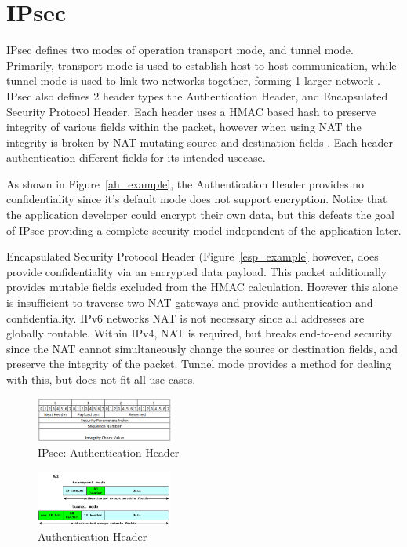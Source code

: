 \documentclass[conference,12pt]{IEEEtran}
\begin{document}
\section{IPsec}
IPsec defines two modes of operation transport mode, and tunnel mode. Primarily,
transport mode is used to establish host to host communication, while tunnel
mode is used to link two networks together, forming 1 larger network \autocite{cisco_ipsec}. IPsec also
defines 2 header types the Authentication Header, and Encapsulated Security
Protocol Header. Each header uses a HMAC based hash to preserve integrity of
various fields within the packet, however when using NAT the integrity is broken 
by NAT mutating source and destination fields \autocite{rfc3022}. Each header
authentication different fields for its intended usecase. 

As shown in Figure~\ref{ah_example}, the Authentication Header provides no
confidentiality since it's default mode does not support encryption.  Notice
that the application developer could encrypt their own data, but this defeats
the goal of IPsec providing a complete security model independent of the
application later. 

Encapsulated Security Protocol Header (Figure~\ref{esp_example} however, does
provide confidentiality via an encrypted data payload. This packet
additionally provides mutable fields excluded from the HMAC calculation. However
this alone is insufficient to traverse two NAT gateways and provide
authentication and confidentiality. IPv6
networks NAT is not necessary since all addresses are globally routable.
Within IPv4, NAT is required, but breaks end-to-end security since the
NAT cannot simultaneously change the source or destination fields, and preserve the integrity
of the packet. Tunnel mode provides a method for dealing with this, but does not
fit all use cases. 

\begin{figure}
\centering
\includegraphics[width=0.4\textwidth]{AH.png}
\caption{IPsec: Authentication Header}
\label{fig:ah}
\end{figure}

\begin{figure}
\centering
\includegraphics[width=0.4\textwidth]{AH_example.PNG}
\caption{Authentication Header \autocite{ipsec_example}}
\label{fig:ah_example}
\end{figure}
\end{document}
